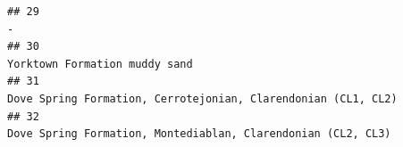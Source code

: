 \documentclass[]{article}
\begin{document}
\begin{verbatim}
## 29                                                                                                                                                                                                                                                                                                                                                                                                                                                                                                                                                                                                                                                                                                -
## 30                                                                                                                                                                                                                                                                                                                                                                                                                                                                                                                                                                                                                                                                    Yorktown Formation muddy sand
## 31                                                                                                                                                                                                                                                                                                                                                                                                                                                                                                                                                                                                                                    Dove Spring Formation, Cerrotejonian, Clarendonian (CL1, CL2)
## 32                                                                                                                                                                                                                                                                                                                                                                                                                                                                                                                                                                                                                                     Dove Spring Formation, Montediablan, Clarendonian (CL2, CL3)

\end{verbatim}
\end{document}
